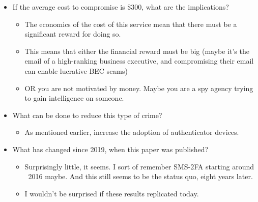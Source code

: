 \documentclass[11pt]{article}
\begin{document}
\begin{itemize}
    \item If the average cost to compromise is \$300, what are the implications?
    \begin{itemize}
        \item The economics of the cost of this service mean that there must be a significant reward for doing so.
        \item This means that either the financial reward must be big (maybe it's the email of a high-ranking business executive, and compromising their email can enable lucrative BEC scams)
        \item OR you are not motivated by money. Maybe you are a spy agency trying to gain intelligence on someone.
    \end{itemize}
    \item What can be done to reduce this type of crime?
    \begin{itemize}
        \item As mentioned earlier, increase the adoption of authenticator devices. 
    \end{itemize}
    \item What has changed since 2019, when this paper was published?
    \begin{itemize}
        \item Surprisingly little, it seems. I sort of remember SMS-2FA starting around ~2016 maybe. And this still seems to be the status quo, eight years later. 
        \item I wouldn't be surprised if these results replicated today. 
    \end{itemize}
\end{itemize}
\end{document}
